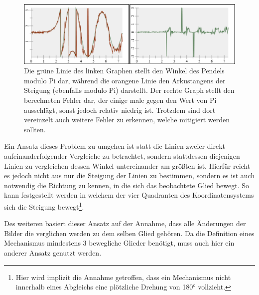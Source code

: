 \begin{figure}[htb]
	\includegraphics[width=\textwidth]{gfx/max_abstand_steigung differenz.png}
	\caption{Die grüne Linie des linken Graphen stellt den Winkel des Pendels modulo Pi dar, während die orangene Linie  den Arkustangens der Steigung (ebenfalls modulo Pi) darstellt. Der rechte Graph stellt den berechneten Fehler dar, der einige male gegen den Wert von Pi ausschlägt, sonst jedoch relativ niedrig ist. Trotzdem sind dort vereinzelt auch weitere Fehler zu erkennen, welche mitigiert werden sollten.}
	\label{fig:max_abstand_steigung differenz}
\end{figure}

Ein Ansatz dieses Problem zu umgehen ist statt die Linien zweier direkt aufeinanderfolgender Vergleiche zu betrachtet, sondern stattdessen diejenigen Linien zu vergleichen dessen Winkel untereinander am größten ist.
Hierfür reicht es jedoch nicht aus nur die Steigung der Linien zu bestimmen, sondern es ist auch notwendig die Richtung zu kennen, in die sich das beobachtete Glied bewegt.
So kann festgestellt werden in welchem der vier Quadranten des Koordinatensystems sich die Steigung bewegt\footnote{Hier wird implizit die Annahme getroffen, dass ein Mechanismus nicht innerhalb eines Abgleichs eine plötzliche Drehung von 180° vollzieht.}.


Des weiteren basiert dieser Ansatz auf der Annahme, dass alle Änderungen der Bilder die verglichen werden zu dem selben Glied gehören.
Da die Definition eines Mechanismus mindestens 3 bewegliche Glieder benötigt, muss auch hier ein anderer Ansatz genutzt werden. %



